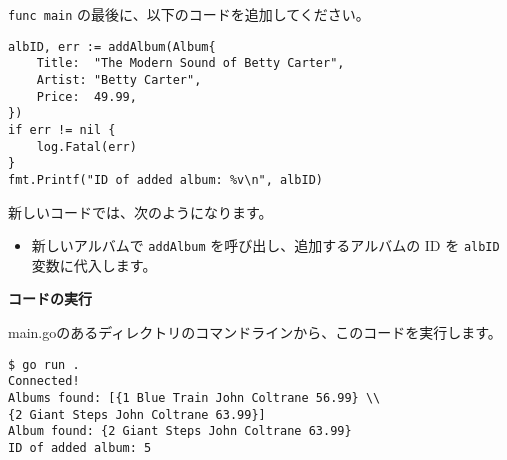 \begin{enumerate}
  \texttt{func\ main} の最後に、以下のコードを追加してください。

\begin{lstlisting}[numbers=none]
albID, err := addAlbum(Album{
    Title:  "The Modern Sound of Betty Carter",
    Artist: "Betty Carter",
    Price:  49.99,
})
if err != nil {
    log.Fatal(err)
}
fmt.Printf("ID of added album: %v\n", albID)
\end{lstlisting}


  新しいコードでは、次のようになります。

  \begin{itemize}
  \tightlist
  \item
    新しいアルバムで \texttt{addAlbum} を呼び出し、追加するアルバムの ID
    を \texttt{albID} 変数に代入します。
  \end{itemize}

\end{enumerate}


\textbf{コードの実行}

main.goのあるディレクトリのコマンドラインから、このコードを実行します。

\begin{lstlisting}[numbers=none]
$ go run .
Connected!
Albums found: [{1 Blue Train John Coltrane 56.99} \\
{2 Giant Steps John Coltrane 63.99}]
Album found: {2 Giant Steps John Coltrane 63.99}
ID of added album: 5
\end{lstlisting}

